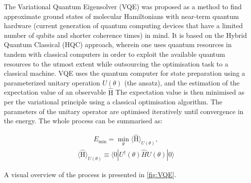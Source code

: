 \documentclass[twoside,twocolumn,9pt]{article}
\begin{document}
{The Variational Quantum Eigensolver (VQE) \cite{Peruzzo2014}\cite{Anand2022} was proposed as a method to find approximate ground states of molecular Hamiltonians with near-term quantum hardware (current generation of quantum computing devices that have a limited number of qubits and shorter coherence times) in mind. It is based on the Hybrid Quantum Classical (HQC) approach, wherein one uses quantum resources in tandem with classical computers in order to exploit the available quantum resources to the utmost extent while outsourcing the optimisation task to a classical machine. VQE uses the quantum computer for state preparation using a parameterized unitary operation $U(\theta)$ (the ansatz), and the estimation of the expectation value of an observable $\hat{\text{H}}$ The expectation value is then minimised as per the variational principle using a classical optimisation algorithm. The parameters of the unitary operator are optimised iteratively until convergence in the energy. The whole process can be
summarised as:

\begin{align}
  E_{\text{min}} = \min_{\theta} \langle \hat{\text{H}} \rangle_{U(\theta)},
\end{align}
\begin{align}
  \langle \hat{\text{H}} \rangle_{U(\theta)} \equiv \langle 0 | U^{\dagger}(\theta) \hat{H} U(\theta) | 0 \rangle
\end{align}

A visual overview of the process is presented in \cref{fig:VQE}.

}
\end{document}
